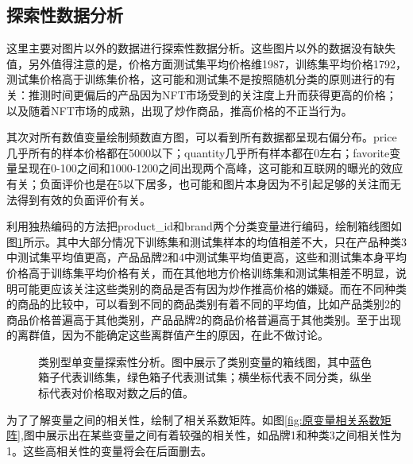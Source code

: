 \documentclass{article}
\begin{document}
\subsection{探索性数据分析}
这里主要对图片以外的数据进行探索性数据分析。这些图片以外的数据没有缺失值，另外值得注意的是，价格方面测试集平均价格维1987，训练集平均价格1792，测试集价格高于训练集价格，这可能和测试集不是按照随机分类的原则进行的有关：推测时间更偏后的产品因为NFT市场受到的关注度上升而获得更高的价格；以及随着NFT市场的成熟，出现了炒作商品，推高价格的不正当行为。
\par 其次对所有数值变量绘制频数直方图，可以看到所有数据都呈现右偏分布。price几乎所有的样本价格都在5000以下；quantity几乎所有样本都在0左右；favorite变量呈现在0-100之间和1000-1200之间出现两个高峰，这可能和互联网的曝光的效应有关；负面评价也是在5以下居多，也可能和图片本身因为不引起足够的关注而无法得到有效的负面评价有关。
\par 利用独热编码的方法把product\_id和brand两个分类变量进行编码，绘制箱线图如图\ref{图：单变量-箱线图}所示。其中大部分情况下训练集和测试集样本的均值相差不大，只在产品种类3中测试集平均值更高，产品品牌2和4中测试集平均值更高，这些和测试集本身平均价格高于训练集平均价格有关，而在其他地方价格训练集和测试集相差不明显，说明可能更应该关注这些类别的商品是否有因为炒作推高价格的嫌疑。而在不同种类的商品的比较中，可以看到不同的商品类别有着不同的平均值，比如产品类别2的商品价格普遍高于其他类别，产品品牌2的商品价格普遍高于其他类别。至于出现的离群值，因为不能确定这些离群值产生的原因，在此不做讨论。
\begin{figure}[!htbp]
	\centering
	\caption{类别型单变量探索性分析。图中展示了类别变量的箱线图，其中蓝色箱子代表训练集，绿色箱子代表测试集；横坐标代表不同分类，纵坐标代表对价格取对数之后的值。}
	\label{图：单变量-箱线图}
\end{figure}
\par 为了了解变量之间的相关性，绘制了相关系数矩阵。如图\ref{fig:原变量相关系数矩阵},图中展示出在某些变量之间有着较强的相关性，如品牌1和种类3之间相关性为1。这些高相关性的变量将会在后面删去。
\end{document}
